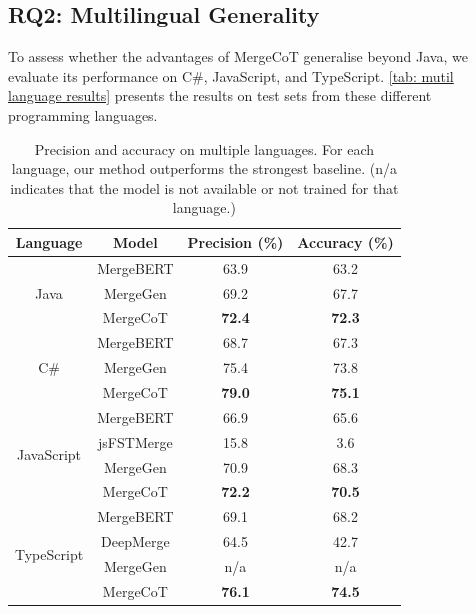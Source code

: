 \documentclass[sigconf,review,anonymous]{acmart}
\begin{document}
\subsection{RQ2: Multilingual Generality}
To assess whether the advantages of MergeCoT generalise beyond Java, we evaluate its performance on C\#, JavaScript, and TypeScript. \autoref{tab: mutil language results} presents the results on test sets from these different programming languages.

\begin{table}[]
\caption{Precision and accuracy on multiple languages. For each language, our method outperforms the strongest baseline. (n/a indicates that the model is not available or not trained for that language.)}
\begin{tabular}{cccc}
\hline
Language          & Model & Precision (\%) & Accuracy (\%) \\ \hline
\multirow{3}{*}{Java}       & MergeBERT      & 63.9                    & 63.2                   \\
                            & MergeGen       & 69.2                    & 67.7                   \\
                            & MergeCoT       & \textbf{72.4}           & \textbf{72.3}          \\ \hline
\multirow{3}{*}{C\#}        & MergeBERT      & 68.7                    & 67.3                   \\
                            & MergeGen       & 75.4                    & 73.8                   \\
                            & MergeCoT       & \textbf{79.0}           & \textbf{75.1}          \\ \hline
\multirow{4}{*}{JavaScript} & MergeBERT      & 66.9                    & 65.6                   \\
                            & jsFSTMerge     & 15.8                    & 3.6                    \\
                            & MergeGen       & 70.9                    & 68.3                   \\
                            & MergeCoT       & \textbf{72.2}           & \textbf{70.5}          \\ \hline
\multirow{4}{*}{TypeScript} & MergeBERT      & 69.1                    & 68.2                   \\
                            & DeepMerge      & 64.5                    & 42.7                   \\
                            & MergeGen       & n/a                     & n/a                    \\
                            & MergeCoT       & \textbf{76.1}           & \textbf{74.5}          \\ \hline
\end{tabular}
\label{tab: mutil language results}
\end{table}
\end{document}
